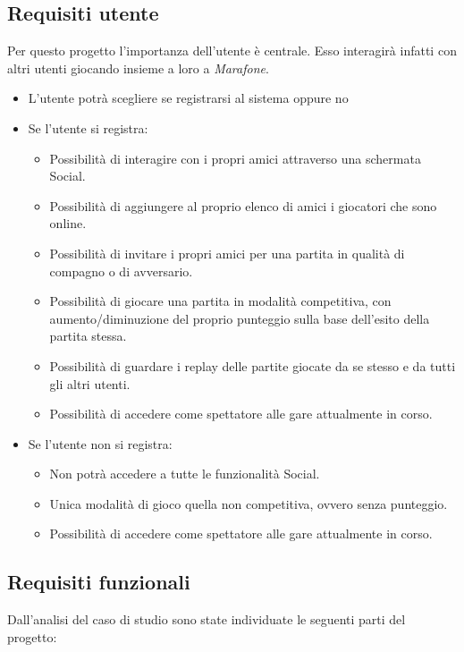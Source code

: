          \subsection {Requisiti utente}\label{subsec:requirements:business}
         Per questo progetto l'importanza dell'utente è centrale. Esso interagirà infatti con altri utenti giocando insieme a loro a \textit{Marafone}. 
         \begin{itemize}
         \item L'utente potrà scegliere se registrarsi al sistema oppure no
	 \item Se l'utente si registra:
	 
	 \begin{itemize}
	 \item Possibilità di interagire con i propri amici attraverso una schermata Social.
	 \item Possibilità di aggiungere al proprio elenco di amici i giocatori che sono online.
	 \item Possibilità di invitare i propri amici per una partita in qualità di compagno o di avversario.
	 \item Possibilità di giocare una partita in modalità competitiva, con aumento/diminuzione del proprio punteggio sulla base dell'esito della partita stessa. 
	 \item Possibilità di guardare i replay delle partite giocate da se stesso e da tutti gli altri utenti.
	 \item Possibilità di accedere come spettatore alle gare attualmente in corso.
	\end {itemize}
	
	\item Se l'utente non si registra:
	
	\begin{itemize}
	\item Non potrà accedere a tutte le funzionalità Social.
	\item Unica modalità di gioco quella non competitiva, ovvero senza punteggio.
	\item Possibilità di accedere come spettatore alle gare attualmente in corso.
	\end {itemize}
	
	\end {itemize}
         \clearpage
             \subsection {Requisiti funzionali}\label{subsec:requirements:functional}
             Dall'analisi del caso di studio sono state individuate le seguenti parti del progetto:
             
